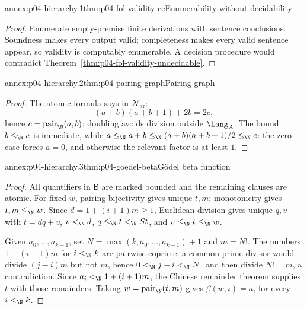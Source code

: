 
\begin{annexitem}{annex:p04-hierarchy.1}{thm:p04-fol-validity-ce}{Enumerability without decidability}
\begin{proof}
Enumerate empty-premise finite derivations with sentence conclusions.
Soundness makes every output valid; completeness makes every valid sentence
appear, so validity is computably enumerable.  A decision procedure would
contradict Theorem~\ref{thm:p04-fol-validity-undecidable}.
\end{proof}
\end{annexitem}

\begin{annexitem}{annex:p04-hierarchy.2}{thm:p04-pairing-graph}{Pairing graph}
\begin{proof}
The atomic formula says in \(\mathcal N_{\mathrm{ar}}\):
\[
 (a+b)(a+b+1)+2b=2c,
\]
hence \(c=\operatorname{pair}_{\N}(a,b)\); doubling avoids division outside
\(\Lang_A\).  The bound \(b\leq_{\N}c\) is immediate, while
\(a\leq_{\N}a+b\leq_{\N}(a+b)(a+b+1)/2\leq_{\N}c\): the zero case forces \(a=0\), and
otherwise the relevant factor is at least \(1\).
\end{proof}
\end{annexitem}

\begin{annexitem}{annex:p04-hierarchy.3}{thm:p04-goedel-beta}{G\"odel beta function}
\begin{proof}
All quantifiers in \(\mathsf B\) are marked bounded and the remaining clauses
are atomic.  For fixed \(w\), pairing bijectivity gives unique \(t,m\);
monotonicity gives \(t,m\leq_{\N}w\).  Since \(d=1+(i+1)m\geq1\), Euclidean
division gives unique \(q,v\) with \(t=dq+v\), \(v<_{\N}d\),
\(q\leq_{\N}t<_{\N}St\), and \(v\leq_{\N}t\leq_{\N}w\).

Given \(a_0,\ldots,a_{k-1}\), set
\(N=\max(k,a_0,\ldots,a_{k-1})+1\) and \(m=N!\).  The numbers
\(1+(i+1)m\) for \(i<_{\N}k\) are pairwise coprime: a common prime divisor would
divide \((j-i)m\) but not \(m\), hence \(0<_{\N}j-i<_{\N}N\), and then divide
\(N!=m\), a contradiction.  Since \(a_i<_{\N}1+(i+1)m\), the Chinese remainder
theorem supplies \(t\) with those remainders.  Taking
\(w=\operatorname{pair}_{\N}(t,m)\) gives \(\beta(w,i)=a_i\) for every
\(i<_{\N}k\).
\end{proof}
\end{annexitem}

